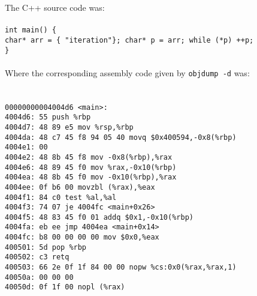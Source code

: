 \documentclass{article}
\begin{document}
 The C++ source code was: 
 \\
 \\
 \texttt{int main() \{} \\
 \texttt{char* arr = \{ "iteration"\}; char* p = arr; while (*p) ++p;}
 \\
 \texttt{\}}
 \\
 \\
 Where the corresponding assembly code given by \texttt{objdump -d} was:
 \\
 \\ 
  \\\texttt{00000000004004d6 <main>:}
  \\\texttt{4004d6:	55                   	push   \%rbp}
   \\\texttt{4004d7:	48 89 e5             	mov    \%rsp,\%rbp}
   \\\texttt{4004da:	48 c7 45 f8 94 05 40 	movq   \$0x400594,-0x8(\%rbp)}
   \\\texttt{4004e1:	00 }
   \\\texttt{4004e2:	48 8b 45 f8          	mov    -0x8(\%rbp),\%rax}
   \\\texttt{4004e6:	48 89 45 f0          	mov    \%rax,-0x10(\%rbp)}
   \\\texttt{4004ea:	48 8b 45 f0          	mov    -0x10(\%rbp),\%rax}
   \\\texttt{4004ee:	0f b6 00             	movzbl (\%rax),\%eax}
   \\\texttt{4004f1:	84 c0                	test   \%al,\%al}
   \\\texttt{4004f3:	74 07                	je     4004fc <main+0x26>}
   \\\texttt{4004f5:	48 83 45 f0 01       	addq   \$0x1,-0x10(\%rbp)}
   \\\texttt{4004fa:	eb ee                	jmp    4004ea <main+0x14>}
   \\\texttt{4004fc:	b8 00 00 00 00       	mov    \$0x0,\%eax}
   \\\texttt{400501:	5d                   	pop    \%rbp}
   \\\texttt{400502:	c3                   	retq   }
   \\\texttt{400503:	66 2e 0f 1f 84 00 00 	nopw   \%cs:0x0(\%rax,\%rax,1)}
   \\\texttt{40050a:	00 00 00 }
   \\\texttt{40050d:	0f 1f 00             	nopl   (\%rax)}
   
\end{document}
